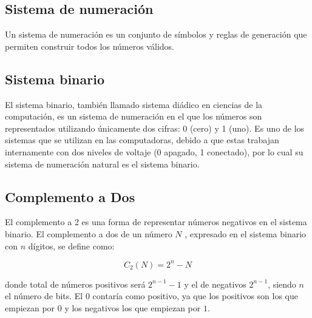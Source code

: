 \subsection{Sistema de numeración}
Un sistema de numeración es un conjunto de símbolos y reglas de generación que permiten construir todos los números válidos.  
\subsection{Sistema binario}
El sistema binario, también llamado sistema diádico en ciencias de la computación, es un sistema de numeración en el que los números son representados utilizando únicamente dos cifras: 0 (cero) y 1 (uno). Es uno de los sistemas que se utilizan en las computadoras, debido a que estas trabajan internamente con dos niveles de voltaje (0 apagado, 1 conectado), por lo cual su sistema de numeración natural es el sistema binario.
\subsection{Complemento a Dos}
El complemento a 2 es una forma de representar números negativos en el sistema binario. El complemento a dos de un número $N$ , expresado en el sistema binario con $n$ dígitos, se define como: 

$$C_2(N)=2^n-N$$

donde total de números positivos será $2^{n-1}-1$ y el de negativos $2^{n-1}$, siendo $n$ el número de bits. El $0$ contaría como positivo, ya que los positivos son los que empiezan por $0$ y los negativos los que empiezan por $1$. 